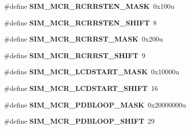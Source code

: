 \begin{DoxyCompactItemize}
\item 
\hypertarget{group___s_i_m___register___masks_gaffd4ecd876a9ad63c9856429f5c48665}{}\#define {\bfseries S\+I\+M\+\_\+\+M\+C\+R\+\_\+\+R\+C\+R\+R\+S\+T\+E\+N\+\_\+\+M\+A\+S\+K}~0x100u\label{group___s_i_m___register___masks_gaffd4ecd876a9ad63c9856429f5c48665}

\item 
\hypertarget{group___s_i_m___register___masks_ga8ee98130c066438ef36a7bdba864cbf6}{}\#define {\bfseries S\+I\+M\+\_\+\+M\+C\+R\+\_\+\+R\+C\+R\+R\+S\+T\+E\+N\+\_\+\+S\+H\+I\+F\+T}~8\label{group___s_i_m___register___masks_ga8ee98130c066438ef36a7bdba864cbf6}

\item 
\hypertarget{group___s_i_m___register___masks_ga2b73aebc7f3cb4bda3f3c09d2b51464e}{}\#define {\bfseries S\+I\+M\+\_\+\+M\+C\+R\+\_\+\+R\+C\+R\+R\+S\+T\+\_\+\+M\+A\+S\+K}~0x200u\label{group___s_i_m___register___masks_ga2b73aebc7f3cb4bda3f3c09d2b51464e}

\item 
\hypertarget{group___s_i_m___register___masks_ga72144a418eeae347a834dd852ea7d999}{}\#define {\bfseries S\+I\+M\+\_\+\+M\+C\+R\+\_\+\+R\+C\+R\+R\+S\+T\+\_\+\+S\+H\+I\+F\+T}~9\label{group___s_i_m___register___masks_ga72144a418eeae347a834dd852ea7d999}

\item 
\hypertarget{group___s_i_m___register___masks_ga869dbe651ffa2f9b7a6371b0d1aaee41}{}\#define {\bfseries S\+I\+M\+\_\+\+M\+C\+R\+\_\+\+L\+C\+D\+S\+T\+A\+R\+T\+\_\+\+M\+A\+S\+K}~0x10000u\label{group___s_i_m___register___masks_ga869dbe651ffa2f9b7a6371b0d1aaee41}

\item 
\hypertarget{group___s_i_m___register___masks_ga80e54d911b5d6c7aa1cb19159afba993}{}\#define {\bfseries S\+I\+M\+\_\+\+M\+C\+R\+\_\+\+L\+C\+D\+S\+T\+A\+R\+T\+\_\+\+S\+H\+I\+F\+T}~16\label{group___s_i_m___register___masks_ga80e54d911b5d6c7aa1cb19159afba993}

\item 
\hypertarget{group___s_i_m___register___masks_gae24e3d37ada59a4c6a9e5d74b4348a17}{}\#define {\bfseries S\+I\+M\+\_\+\+M\+C\+R\+\_\+\+P\+D\+B\+L\+O\+O\+P\+\_\+\+M\+A\+S\+K}~0x20000000u\label{group___s_i_m___register___masks_gae24e3d37ada59a4c6a9e5d74b4348a17}

\item 
\hypertarget{group___s_i_m___register___masks_ga41e3c4771210cbb6296e29278a84366b}{}\#define {\bfseries S\+I\+M\+\_\+\+M\+C\+R\+\_\+\+P\+D\+B\+L\+O\+O\+P\+\_\+\+S\+H\+I\+F\+T}~29\label{group___s_i_m___register___masks_ga41e3c4771210cbb6296e29278a84366b}


\end{DoxyCompactItemize}
